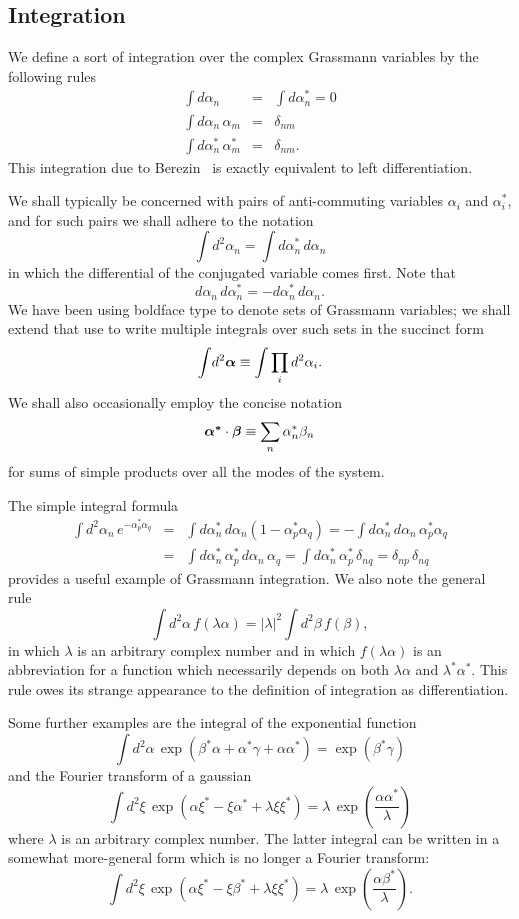 \documentclass[12pt]{article}
\def\beq{\begin{equation}}
\def\eeq{\end{equation}}
\def\bea{\begin{eqnarray}}
\def\eea{\end{eqnarray}}
\def\a{\alpha}
\def\ba{{\mbox{\boldmath$\alpha$}}}
\def\bsa{{\mbox{\boldmath$\alpha^*$}}}
\def\sa{\alpha^*}
\def\b{\beta}
\def\bb{{\mbox{\boldmath$\beta$}}}
\def\sb{\beta^*}
\def\c{\gamma}
\def\d{\delta}
\def\l{\lambda}
\def\x{\xi}
\def\xs{\xi^*}
\def\nn{\nonumber}
\begin{document}
\subsection{Integration}
We define a sort of integration over the complex
Grassmann variables by the following rules
\bea
\int \! d\a_n & = & \int \! d\sa_n = 0 \label {I0} \\
\int \! d\a_n \, \a_m & = & \d_{nm} \label {I1} \\
\int \! d\sa_n \, \sa_m & = & \d_{nm} .
\label {intdef}
\eea
This integration due to Berezin~\cite{b}
is exactly equivalent to left differentiation.
\par
We shall typically be concerned with
pairs of anti-commuting variables
$ \a_i $ and $ \sa_i $, and for such pairs
we shall adhere to the notation
\beq
\int \! d^2\a_n = \int d\sa_n \, d\a_n 
\label {d2a}
\eeq
in which the differential of the
conjugated variable comes first.
Note that 
\beq
d\a_n \, d\sa_n = - d\sa_n \, d\a_n .
\label {warnac}
\eeq
We have been using boldface type to denote 
sets of Grassmann variables;
we shall extend that use to write
multiple integrals over such sets in the succinct form
\beq
\int \! d^2\ba \equiv \int \prod_i d^2\a_i .
\label {dba}
\eeq
We shall also occasionally employ the concise notation
\beq
\bsa \cdot \bb \equiv \sum_n \sa_n \b_n 
\label {sumdot}
\eeq 
for sums of simple products over all the modes of the system.
\par
The simple integral formula 
\bea
\int \! d^2\a_n \, e^{ - \sa_p \a_q } 
& = & \int \! d\sa_n \, d\a_n \left( 1 - \sa_p \a_q \right)
= - \int \! d\sa_n \, d\a_n  \, \sa_p \a_q \nn\\
& = & \int \! d\sa_n \, \sa_p \, d\a_n \, \a_q
= \int \! d\sa_n \, \sa_p \, \d_{ n q } = \d_{ n p } \, \d_{ n q }  
\label {ex0}
\eea
provides a useful example of Grassmann integration.
We also note the general rule
\beq
\int \! d^2\a \, f( \lambda \a ) =
| \lambda |^2 \int \! d^2 \b \, f( \b ) ,
\label {ex1}
\eeq
in which $ \lambda $ is an arbitrary complex number
and in which $ f ( \lambda \a ) $ is an abbreviation
for a function which necessarily depends on both $ \lambda \a $
and $ \lambda^* \a^* $. 
This rule owes its strange appearance to the definition
of integration as differentiation.
\par
Some further examples are the integral of 
the exponential function 
\beq
\int \! d^2\a \, \exp \left( \sb \a + \sa \c + \a \sa \right)
= \exp \left( \sb \c \right) 
\label {ex2}
\eeq
and the Fourier transform of a gaussian
\beq
\int \! d^2\x \, \exp \left( \a \xs - \x \sa + \l \x \xs \right)
= \l \, \exp \left( \frac{ \a \sa }{ \l } \right)
\label {ex3}
\eeq
where $ \l $ is an arbitrary complex number.
The latter integral can be written in a somewhat 
more-general form which is no longer a Fourier transform:
\beq
\int \! d^2\x \, \exp \left( \a \xs - \x \sb + \l \x \xs \right)
= \l \, \exp \left( \frac{ \a \sb }{ \l } \right) .
\label {ex4}
\eeq
 
\end{document}
